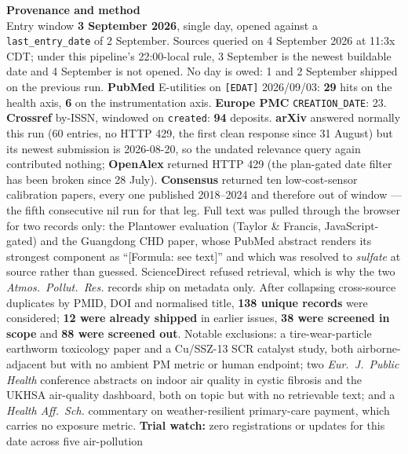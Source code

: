 \documentclass[10pt]{article}
\begin{document}


\vspace{4mm}
\begin{keybox}
{\sffamily\bfseries\footnotesize\color{Deep}Provenance and method}\\[1.2mm]
{\fontsize{7.2}{8.8}\selectfont
Entry window \textbf{3 September 2026}, single day, opened against a
\texttt{last\_entry\_date} of 2 September. Sources queried on 4 September 2026 at 11:3x
CDT; under this pipeline's 22:00-local rule, 3 September is the newest buildable date and
4 September is not opened. No day is owed: 1 and 2 September shipped on the previous run.
\textbf{PubMed} E-utilities on \texttt{[EDAT]} 2026/09/03: \textbf{29} hits on the health
axis, \textbf{6} on the instrumentation axis.
\textbf{Europe PMC} \texttt{CREATION\_DATE}: 23.
\textbf{Crossref} by-ISSN, windowed on \texttt{created}: \textbf{94} deposits.
\textbf{arXiv} answered normally this run (60 entries, no HTTP 429, the first clean
response since 31 August) but its newest submission is 2026-08-20, so the undated relevance
query again contributed nothing; \textbf{OpenAlex} returned HTTP 429 (the plan-gated date
filter has been broken since 28 July). \textbf{Consensus} returned ten low-cost-sensor
calibration papers, every one published 2018--2024 and therefore out of window --- the
fifth consecutive nil run for that leg. Full text was pulled through the browser for two
records only: the Plantower evaluation (Taylor \& Francis, JavaScript-gated) and the
Guangdong CHD paper, whose PubMed abstract renders its strongest component as
``[Formula: see text]'' and which was resolved to \emph{sulfate} at source rather than
guessed. ScienceDirect refused retrieval, which is why the two \textit{Atmos.\ Pollut.\
Res.} records ship on metadata only.
After collapsing cross-source duplicates by PMID, DOI and normalised title, \textbf{138
unique records} were considered; \textbf{12 were already shipped} in earlier issues,
\textbf{38 were screened in scope} and \textbf{88 were screened out}. Notable exclusions: a
tire-wear-particle earthworm toxicology paper and a Cu/SSZ-13 SCR catalyst study, both
airborne-adjacent but with no ambient PM metric or human endpoint; two \textit{Eur.\ J.\
Public Health} conference abstracts on indoor air quality in cystic fibrosis and the UKHSA
air-quality dashboard, both on topic but with no retrievable text; and a
\textit{Health Aff.\ Sch.} commentary on weather-resilient primary-care payment, which
carries no exposure metric.
\textbf{Trial watch:} zero registrations or updates for this date across five air-pollution
}
\end{keybox}
\end{document}
